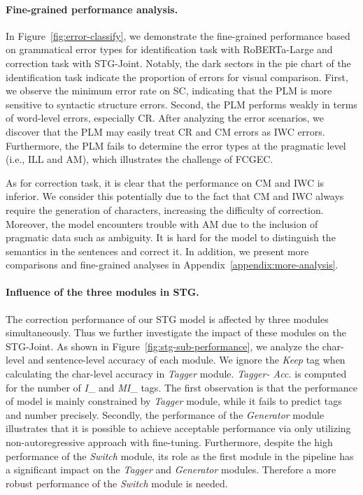 \documentclass[11pt]{article}
\begin{document}
\paragraph{Fine-grained performance analysis.} In Figure~\ref{fig:error-classify}, we demonstrate the fine-grained performance based on grammatical error types for identification task with RoBERTa-Large and correction task with STG-Joint. Notably, the dark sectors in the pie chart of the identification task indicate the proportion of errors for visual comparison. First, we observe the minimum error rate on SC, indicating that the PLM is more sensitive to syntactic structure errors. Second, the PLM performs weakly in terms of word-level errors, especially CR. After analyzing the error scenarios, we discover that the PLM may easily treat CR and CM errors as IWC errors. Furthermore, the PLM fails to determine the error types at the pragmatic level (i.e., ILL and AM), which illustrates the challenge of FCGEC.

As for correction task, it is clear that the performance on CM and IWC is inferior. We consider this potentially due to the fact that CM and IWC always require the generation of characters, increasing the difficulty of correction. Moreover, the model encounters trouble with AM due to the inclusion of pragmatic data such as ambiguity. It is hard for the model to distinguish the semantics in the sentences and correct it. In addition, we present more comparisons and fine-grained analyses in Appendix~\ref{appendix:more-analysis}.


\paragraph{Influence of the three modules in STG.} The correction performance of our STG model is affected by three modules simultaneously. Thus we further investigate the impact of these modules on the STG-Joint. As shown in Figure~\ref{fig:stg-sub-performance}, we analyze the char-level and sentence-level accuracy of each module. We ignore the \emph{Keep} tag when calculating the char-level accuracy in \emph{Tagger} module. \emph{Tagger- Acc.} is computed for the number  of \emph{I}\_ and \emph{MI}\_ tags.  The first observation is that the performance of model is mainly constrained by \emph{Tagger} module, while it fails to predict tags and number  precisely. Secondly, the performance of the \emph{Generator} module illustrates that it is possible to achieve acceptable performance via only utilizing non-autoregressive approach with fine-tuning. Furthermore, despite the high performance of the \emph{Switch} module, its role as the first module in the pipeline has a significant impact on the \emph{Tagger} and \emph{Generator} modules. Therefore a more robust performance of the \emph{Switch} module is needed. 
\end{document}
